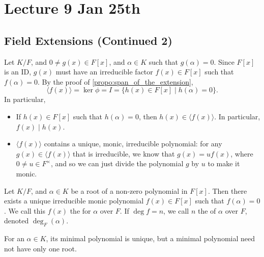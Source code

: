 \documentclass[notoc,notitlepage]{tufte-book}
\begin{document}


\chapter{Lecture 9 Jan 25th}%
\label{chp:lecture_9_jan_25th}

\section{Field Extensions (Continued 2)}%
\label{sec:field_extensions_continued_2}

Let $K / F$, and $0 \neq g(x) \in F[x]$, and $\alpha \in K$ such that $g(\alpha) = 0$. Since $F[x]$ is an
ID, $g(x)$ must have an irreducible factor $f(x) \in F[x]$ such that $f(\alpha) = 0$. By the proof of
\cref{propo:span_of_the_extension},
\begin{equation*}
  \langle f(x) \rangle = \ker \phi = I = \{ h(x) \in F[x] \mid h(\alpha) = 0 \}.
\end{equation*}
In particular,
\begin{itemize}
  \item If $h(x) \in F[x]$ such that $h(\alpha) = 0$, then $h(x) \in \langle f(x) \rangle$. In particular,
    $f(x) \mid h(x)$.
  \item $\langle f(x) \rangle$ contains a unique, monic, irreducible polynomial: for any $g(x) \in 
    \langle f(x) \rangle$ that is irreducible, we know that $g(x) = uf(x)$, where $0 \neq u \in F^\times$,
    and so we can just divide the polynomial $g$ by $u$ to make it monic.
\end{itemize}

\begin{defn}\label{defn:minimal_polynomial}
  Let $K / F$, and $\alpha \in K$ be a root of a non-zero polynomial in $F[x]$. Then there exists a
  unique irreducible monic polynomial $f(x) \in F[x]$ such that $f(\alpha) = 0$. We call this $f(x)$
  the  for $\alpha$ over $F$. If $\deg f = n$, we call $n$ the 
  of $\alpha$ over $F$, denoted $\deg_F(\alpha)$.
\end{defn}

\begin{note}
  For an $\alpha \in K$, its minimal polynomial is unique, but a minimal polynomial need not have only
  one root.
\end{note}
\end{document}
